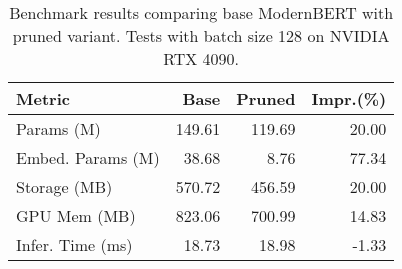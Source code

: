 \begin{table}[htb]
\centering
\scriptsize
\setlength{\tabcolsep}{3pt}
\begin{tabular}{lrrr}
\toprule
\textbf{Metric} & \textbf{Base} & \textbf{Pruned} & \textbf{Impr.(\%)} \\
\midrule
Params (M) & 149.61 & 119.69 & 20.00 \\
Embed. Params (M) & 38.68 & 8.76 & 77.34 \\
Storage (MB) & 570.72 & 456.59 & 20.00 \\
GPU Mem (MB) & 823.06 & 700.99 & 14.83 \\
Infer. Time (ms) & 18.73 & 18.98 & -1.33 \\
\bottomrule
\end{tabular}
\caption{Benchmark results comparing base ModernBERT with pruned variant. Tests with batch size 128 on NVIDIA RTX 4090.}
\label{tab:benchmark_results}
\end{table} 
